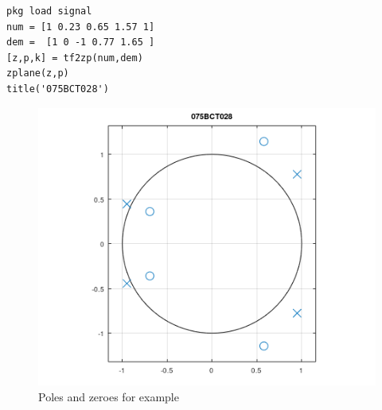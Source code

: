 \documentclass[12pt]{article}
\begin{document}
\begin{Verbatim}[frame=single]
pkg load signal
num = [1 0.23 0.65 1.57 1]
dem =  [1 0 -1 0.77 1.65 ]
[z,p,k] = tf2zp(num,dem)
zplane(z,p)
title('075BCT028')
        \end{Verbatim}
        \begin{figure}[h!]
            \centering
            \includegraphics{labss/Lab5_Example.PNG}
            \caption{Poles and zeroes for example}
        \end{figure}
\end{document}
